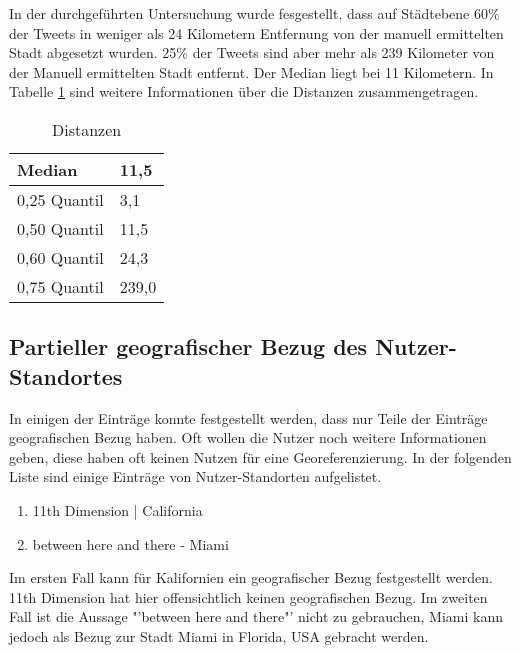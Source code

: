 			In der durchgeführten Untersuchung wurde fesgestellt, dass auf Städtebene 60\% der Tweets in weniger als 24 Kilometern Entfernung von der manuell ermittelten Stadt abgesetzt wurden.
			25\% der Tweets sind aber mehr als 239 Kilometer von der Manuell ermittelten Stadt entfernt. 
			Der Median liegt bei 11 Kilometern.
			In Tabelle \ref{tab:distancesP} sind weitere Informationen über die Distanzen zusammengetragen.

			\begin{table}[h]
			\centering
			\caption{Distanzen}
			\label{tab:distancesP}
			\begin{tabular}{|l|l|}
			\hline
			Median       & 11,5  \\ \hline
			0,25 Quantil & 3,1   \\ \hline
			0,50 Quantil & 11,5  \\ \hline
			0,60 Quantil & 24,3  \\ \hline
			0,75 Quantil & 239,0 \\ \hline
			\end{tabular}
			\end{table}


		\subsection*{Partieller geografischer Bezug des Nutzer-Standortes} \label{subsec:partiellerGeografischerBezug} 

			In einigen der Einträge konnte festgestellt werden, dass nur Teile der Einträge geografischen Bezug haben. 
			Oft wollen die Nutzer noch weitere Informationen geben, diese haben oft keinen Nutzen für eine Georeferenzierung. 
			In der folgenden Liste sind einige Einträge von Nutzer-Standorten aufgelistet. 

			\begin{enumerate}
				\item 11th Dimension | California
				\item between here and there - Miami
			\end{enumerate}

			Im ersten Fall kann für Kalifornien ein geografischer Bezug festgestellt werden.
			11th Dimension hat hier offensichtlich keinen geografischen Bezug.
			Im zweiten Fall ist die Aussage "'between here and there"' nicht zu gebrauchen, Miami kann jedoch als Bezug zur Stadt Miami in Florida, USA gebracht werden.
			
